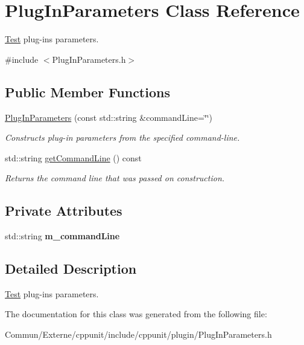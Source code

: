 \hypertarget{class_plug_in_parameters}{}\section{Plug\+In\+Parameters Class Reference}
\label{class_plug_in_parameters}


\hyperlink{class_test}{Test} plug-\/ins parameters.  




{\ttfamily \#include $<$Plug\+In\+Parameters.\+h$>$}

\subsection*{Public Member Functions}
\begin{DoxyCompactItemize}
\item 
\hyperlink{class_plug_in_parameters_acbf183c92faaa4e17dc66dec87ddc033}{Plug\+In\+Parameters} (const std\+::string \&command\+Line=\char`\"{}\char`\"{})\hypertarget{class_plug_in_parameters_acbf183c92faaa4e17dc66dec87ddc033}{}\label{class_plug_in_parameters_acbf183c92faaa4e17dc66dec87ddc033}

\begin{DoxyCompactList}\small\item\em Constructs plug-\/in parameters from the specified command-\/line. \end{DoxyCompactList}\item 
std\+::string \hyperlink{class_plug_in_parameters_aad9dfbb3f1745b72154ab6b70948d629}{get\+Command\+Line} () const \hypertarget{class_plug_in_parameters_aad9dfbb3f1745b72154ab6b70948d629}{}\label{class_plug_in_parameters_aad9dfbb3f1745b72154ab6b70948d629}

\begin{DoxyCompactList}\small\item\em Returns the command line that was passed on construction. \end{DoxyCompactList}\end{DoxyCompactItemize}
\subsection*{Private Attributes}
\begin{DoxyCompactItemize}
\item 
std\+::string {\bfseries m\+\_\+command\+Line}\hypertarget{class_plug_in_parameters_af164285372df2f487f5e59a1f5abe8a4}{}\label{class_plug_in_parameters_af164285372df2f487f5e59a1f5abe8a4}

\end{DoxyCompactItemize}


\subsection{Detailed Description}
\hyperlink{class_test}{Test} plug-\/ins parameters. 

The documentation for this class was generated from the following file\+:\begin{DoxyCompactItemize}
\item 
Commun/\+Externe/cppunit/include/cppunit/plugin/Plug\+In\+Parameters.\+h\end{DoxyCompactItemize}
